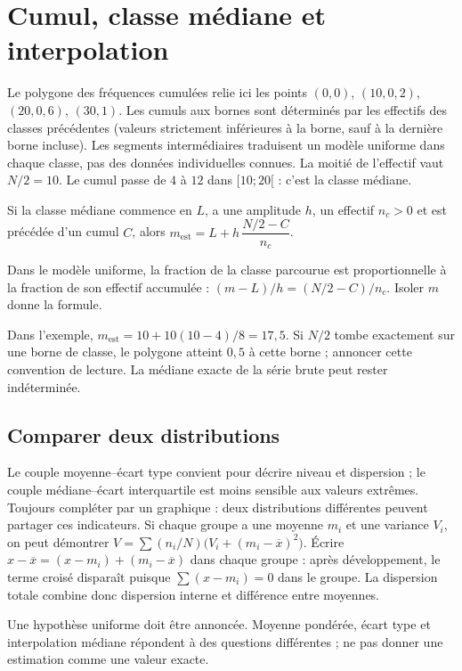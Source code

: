 \documentclass[../cours_2de.tex]{subfiles}
\begin{document}
\section{Cumul, classe médiane et interpolation}
Le polygone des fréquences cumulées relie ici les points
$(0,0)$, $(10,0{,}2)$, $(20,0{,}6)$, $(30,1)$.
Les cumuls aux bornes sont déterminés par les effectifs des classes précédentes (valeurs strictement inférieures à la borne, sauf à la dernière borne incluse). Les segments intermédiaires traduisent un modèle uniforme dans chaque classe, pas des données individuelles connues.
La moitié de l'effectif vaut $N/2=10$. Le cumul passe de $4$ à $12$ dans $[10;20[$ : c'est la classe médiane.
\begin{propriete}
Si la classe médiane commence en $L$, a une amplitude $h$, un effectif $n_c>0$ et est précédée d'un cumul $C$, alors
$m_{\mathrm{est}}=L+h\,\dfrac{N/2-C}{n_c}$.
\end{propriete}
\begin{demonstration}
Dans le modèle uniforme, la fraction de la classe parcourue est proportionnelle à la fraction de son effectif accumulée :
$(m-L)/h=(N/2-C)/n_c$. Isoler $m$ donne la formule.
\end{demonstration}
Dans l'exemple, $m_{\mathrm{est}}=10+10(10-4)/8=17{,}5$.
Si $N/2$ tombe exactement sur une borne de classe, le polygone atteint $0{,}5$ à cette borne ; annoncer cette convention de lecture. La médiane exacte de la série brute peut rester indéterminée.
\begin{finchapitre}
\section{Comparer deux distributions}
Le couple moyenne--écart type convient pour décrire niveau et dispersion ; le couple médiane--écart interquartile est moins sensible aux valeurs extrêmes.
Toujours compléter par un graphique : deux distributions différentes peuvent partager ces indicateurs.
\approfondissement Si chaque groupe a une moyenne $m_i$ et une variance $V_i$, on peut démontrer
$V=\sum (n_i/N)\bigl(V_i+(m_i-\overline x)^2\bigr)$.
Écrire $x-\overline x=(x-m_i)+(m_i-\overline x)$ dans chaque groupe : après développement, le terme croisé disparaît puisque $\sum(x-m_i)=0$ dans le groupe. La dispersion totale combine donc dispersion interne et différence entre moyennes.
\begin{retenir}
Une hypothèse uniforme doit être annoncée. Moyenne pondérée, écart type et interpolation médiane répondent à des questions différentes ; ne pas donner une estimation comme une valeur exacte.
\end{retenir}
\end{finchapitre}
\end{document}
